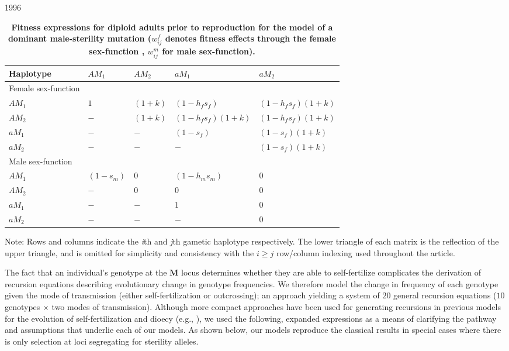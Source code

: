 1996\documentclass[9pt,twocolumn,twoside,lineno]{gsajnl}
\begin{document}
\begin{table*}[htbp]
\centering
\caption{\bf Fitness expressions for diploid adults prior to reproduction for the model of a dominant male-sterility mutation ($w^f_{ij}$ denotes fitness effects through the female sex-function , $w^m_{ij}$ for male sex-function).}
\begin{tableminipage}{\textwidth}
\begin{tabularx}{\textwidth}{XXXXX}
\hline
Haplotype & $ AM_1$ & $ AM_2$ & $ aM_1$ & $ aM_2$ \\
\hline
Female sex-function & & & & \\
$ AM_1$ & $1$ & $(1 + k)$ & $(1 - h_f s_f)$        & $(1 - h_f s_f)(1 + k)$ \\
$ AM_2$ & $-$ & $(1 + k)$ & $(1 - h_f s_f)(1 + k)$ & $(1 - h_f s_f)(1 + k)$ \\
$ aM_1$ & $-$ & $-$       & $(1 - s_f)$            & $(1 - s_f)(1 + k)$ \\
$ aM_2$ & $-$ & $-$       & $-$                    & $(1 - s_f)(1 + k)$ \\
Male sex-function & & & & \\
$ AM_1$ & $(1 - s_m)$ & $0$ & $(1 - h_m s_m)$ & $0$ \\
$ AM_2$ & $-$         & $0$ & $0$             & $0$ \\
$ aM_1$ & $-$         & $-$ & $1$             & $0$ \\
$ aM_2$ & $-$         & $-$ & $-$             & $0$ \\
\hline
\end{tabularx}
  \label{tab:fitness}
\end{tableminipage}
{\footnotesize Note: Rows and columns indicate the \textit{i}th and \textit{j}th gametic haplotype respectively. The lower triangle of each matrix is the reflection of the upper triangle, and is omitted for simplicity and consistency with the $i \geq j$ row/column indexing used throughout the article.}
\end{table*}


The fact that an individual's genotype at the $\mathbf{M}$ locus determines whether they are able to self-fertilize complicates the derivation of recursion equations describing evolutionary change in genotype frequencies. We therefore model the change in frequency of each genotype given the mode of transmission (either self-fertilization or outcrossing); an approach yielding a system of $20$ general recursion equations ($10$ genotypes $\times$ two modes of transmission). Although more compact approaches have been used for generating recursions in previous models for the evolution of self-fertilization and dioecy (e.g., \citealt{Charlesworth1978a,Charlesworth2010}), we used the following, expanded expressions as a means of clarifying the pathway and assumptions that underlie each of our models. As shown below, our models reproduce the classical results in special cases where there is only selection at loci segregating for sterility alleles.
\end{document}
